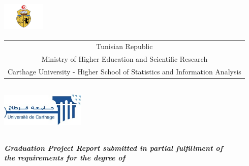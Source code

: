 \documentclass[a4paper, oneside]{report}
\title{\reportSubject}
\author{\reportAuthor}
\newcommand{\reportTitle} {%
  \textsc{Graduation Project Report}
}
\newcommand{\studyDepartment} {%
  Entreprise d'accueil %
}
\newcommand{\ESSAI} {%
  Higher School of Statistics and Information Analysis
}
\begin{document}
\thispagestyle{empty}
\begin{titlepage}
\begin{center}


\includegraphics[width=2cm, height=1.5cm]{embleme.jpg}\\

{%
  \fontsize{9pt}{9pt}\selectfont%
  \begin{tabular}{c}
    Tunisian Republic\\
    Ministry of Higher Education and Scientific Research \\%
    Carthage University - \ESSAI{}  \\
  \end{tabular}
}

\vspace{10pt}
\includegraphics[width=4cm, height=2.5cm]{universite-carthage.jpg} \\


\vspace{30pt} {%
  \renewcommand*{\familydefault}{\defaultFont}
  \fontsize{46pt}{46pt}\selectfont%
}

\vspace{30pt}
\textbf{\textit{Graduation Project Report submitted in partial fulfillment of}}\\
\textbf{\textit{the requirements for the degree of}}\\


\end{center}
\end{titlepage}
\end{document}
